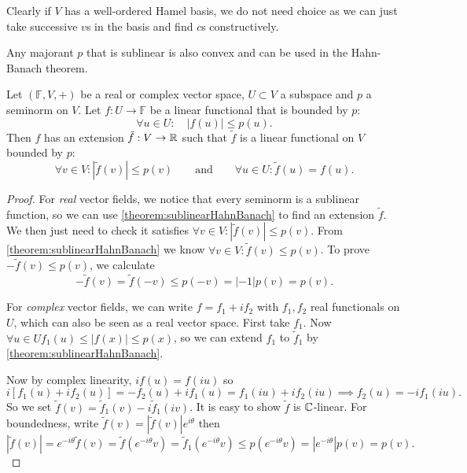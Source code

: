 Clearly if $V$ has a well-ordered Hamel basis, we do not need choice as we can just take successive $v$s in the basis and find $c$s constructively.
\begin{corollary} \label{theorem:sublinearHahnBanach}
Any majorant $p$ that is sublinear is also convex and can be used in the Hahn-Banach theorem.
\end{corollary}
\begin{corollary} \label{theorem:seminormHahnBanach}
Let $(\mathbb{F},V,+)$ be a real or complex vector space, $U\subset V$ a subspace and $p$ a seminorm on $V$. Let $f:U\to\mathbb{F}$ be a linear functional that is bounded by $p$:
\[ \forall u\in U: \quad |f(u)| \leq p(u). \]
Then $f$ has an extension $\tilde{f}: V\to \mathbb{R}$ such that $\tilde{f}$ is a linear functional on $V$ bounded by $p$:
\[ \forall v\in V: |\tilde{f}(v)| \leq p(v) \qquad \text{and} \qquad \forall u\in U: \tilde{f}(u) = f(u). \]
\end{corollary}
\begin{proof}
For \emph{real} vector fields, we notice that every seminorm is a sublinear function, so we can use \ref{theorem:sublinearHahnBanach} to find an extension $\tilde{f}$. We then just need to check it satisfies $\forall v\in V: |\tilde{f}(v)| \leq p(v)$.
From \ref{theorem:sublinearHahnBanach} we know $\forall v\in V: \tilde{f}(v) \leq p(v)$.
To prove $-\tilde{f}(v) \leq p(v)$, we calculate
\[ -\tilde{f}(v) = \tilde{f}(-v) \leq p(-v) = |-1|p(v) = p(v). \]

For \emph{complex} vector fields, we can write $f= f_1 + if_2$ with $f_1,f_2$ real functionals on $U$, which can also be seen as a real vector space. First take $f_1$. Now $\forall u\in U f_1(u) \leq |f(x)| \leq p(x)$, so we can extend $f_1$ to $\tilde{f}_1$ by \ref{theorem:sublinearHahnBanach}.

Now by complex linearity, $if(u) = f(iu)$ so
\[ i[f_1(u) + if_2(u)] = -f_2(u) + if_1(u) = f_1(iu) + if_2(iu) \implies f_2(u) = -if_1(iu). \]
So we set $\tilde{f}(v) = \tilde{f}_1(v)-i\tilde{f}_1(iv)$. It is easy to show $\tilde{f}$ is $\mathbb{C}$-linear. For boundedness, write $\tilde{f}(v) = |\tilde{f}(v)|e^{i\theta}$ then
\[ |\tilde{f}(v)| = e^{-i\theta}\tilde{f}(v) = \tilde{f}(e^{-i\theta}v) = \tilde{f}_1(e^{-i\theta}v) \leq p(e^{-i\theta}v) = |e^{-i\theta}|p(v) = p(v). \]
\end{proof}

